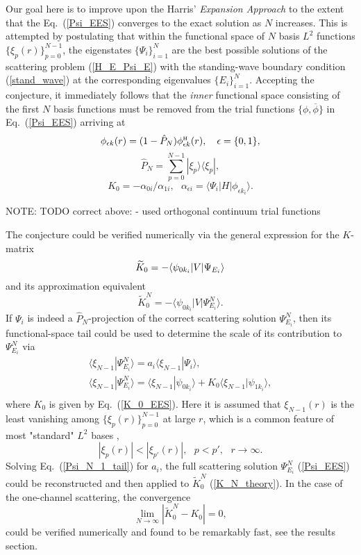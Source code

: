 \documentclass[aip
, pra
, showpacs
, aps
, twocolumn
, groupedaddress
, floatfix
]{revtex4}
\newcommand{\beq}{\begin{equation}}
\newcommand{\eeq}{\end{equation}}
\newcommand{\barr}{\begin{array}}
\newcommand{\earr}{\end{array}}
\newcommand{\phiH}{\phi^{\mbox{\tiny{H}}}}
\begin{document}
Our goal here is to improve upon the Harris' {\em Expansion Approach} \cite{Harris67} to the extent that the Eq.~(\ref{Psi_EES})
converges to the exact solution as $N$ increases.
This is attempted by postulating that
within the functional space of $N$ basis $L^2$ functions  $\{\xi_p(r)\}_{p=0}^{N-1}$,
the eigenstates $\{\Psi_i\}_{i=1}^{N}$ are the best possible solutions of the scattering problem (\ref{H_E_Psi_E})
with the standing-wave boundary condition (\ref{stand_wave}) at the corresponding eigenvalues $\{E_i\}_{i=1}^{N}$.
Accepting the conjecture, it immediately follows that the {\em inner} functional space consisting of the first $N$ basis functions
must be removed from the trial functions $\{\phi,\overline{\phi}\}$ in Eq.~(\ref{Psi_EES}) arriving at
\beq
\phi_{\epsilon k}(r) = (1-\hat{P}_N) \phiH_{\epsilon k}(r),\ \ \ \epsilon = \{0,1\},
\label{def_phi} \eeq
\beq
\hat{P}_N = \sum_{p=0}^{N-1} | \xi_p \rangle \langle \xi_p |,
\label{P_N} \eeq
\beq
K_{0} = - \alpha_{0i} / \alpha_{1i}, \ \ \
\alpha_{\epsilon i} = \langle\Psi_i|H|  \phi_{\epsilon k_i} \rangle.
\label{K_0_EES} \eeq

NOTE: TODO correct above: \cite{HM69} - used orthogonal continuum trial functions


The conjecture could be verified numerically via the general expression for the $K$-matrix \cite{N82}
\beq
\widetilde{K}_0 = -\langle \psi_{0k_i} | V | \Psi_{E_i} \rangle\\
\label{K_theory}\eeq
and its approximation equivalent
\beq
\widetilde{K}^N_0 = -\langle \psi_{0k_i} | V | \Psi^N_{E_i} \rangle.
\label{K_N_theory}\eeq
If $\Psi_i$ is indeed a $\hat{P}_N$-projection of the correct scattering solution $\Psi^N_{E_i}$,
then its functional-space tail could be used to
determine the scale of its contribution to $\Psi^N_{E_i}$ via
\beq \barr{l}
\langle \xi_{N-1} | \Psi^N_{E_i}\rangle
= a_i \langle \xi_{N-1}| \Psi_i \rangle,\\
\langle \xi_{N-1} | \Psi^N_{E_i}\rangle
 =  \langle \xi_{N-1}| \psi_{0k_i} \rangle
+ K_0 \langle \xi_{N-1}| \psi_{1k_i} \rangle,\\
\earr \label{Psi_N_1_tail} \eeq
where $K_0$ is given by Eq.~(\ref{K_0_EES}).
Here it is assumed that $\xi_{N-1}(r)$ is the least vanishing among $\{\xi_p(r)\}_{p=0}^{N-1}$  at large $r$, which is
a common feature of most "standard" $L^2$ bases \cite{abramowitz},
\beq
|\xi_p(r)| < |\xi_{p'}(r)|, \ \ \ p<p', \ \ \ r \rightarrow \infty.
\eeq
Solving Eq.~(\ref{Psi_N_1_tail}) for $a_i$,
the full scattering solution $\Psi^N_{E_i}$ (\ref{Psi_EES}) could be reconstructed and then applied to $\widetilde{K}^N_0$ (\ref{K_N_theory}).
In the case of the one-channel scattering, the convergence
\beq
\lim_{N \rightarrow \infty} |\widetilde{K}^N_0 - K_0 | = 0,
\label{K_N_0_lim} \eeq
could be verified numerically and found to be
remarkably fast, see the results section.
\end{document}
